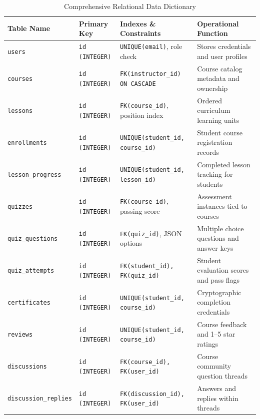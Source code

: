 \documentclass[12pt,a4paper]{report}
\begin{document}
\begin{table}[H]
\centering
\caption{Comprehensive Relational Data Dictionary}
\label{tab:datadict}
\begin{tabularx}{\textwidth}{@{}lllX@{}}
\toprule
\textbf{Table Name} & \textbf{Primary Key} & \textbf{Indexes \& Constraints} & \textbf{Operational Function} \\ \midrule
\texttt{users} & \texttt{id (INTEGER)} & \texttt{UNIQUE(email)}, role check & Stores credentials and user profiles \\
\texttt{courses} & \texttt{id (INTEGER)} & \texttt{FK(instructor\_id) ON CASCADE} & Course catalog metadata and ownership \\
\texttt{lessons} & \texttt{id (INTEGER)} & \texttt{FK(course\_id)}, position index & Ordered curriculum learning units \\
\texttt{enrollments} & \texttt{id (INTEGER)} & \texttt{UNIQUE(student\_id, course\_id)} & Student course registration records \\
\texttt{lesson\_progress} & \texttt{id (INTEGER)} & \texttt{UNIQUE(student\_id, lesson\_id)} & Completed lesson tracking for students \\
\texttt{quizzes} & \texttt{id (INTEGER)} & \texttt{FK(course\_id)}, passing score & Assessment instances tied to courses \\
\texttt{quiz\_questions} & \texttt{id (INTEGER)} & \texttt{FK(quiz\_id)}, JSON options & Multiple choice questions and answer keys \\
\texttt{quiz\_attempts} & \texttt{id (INTEGER)} & \texttt{FK(student\_id), FK(quiz\_id)} & Student evaluation scores and pass flags \\
\texttt{certificates} & \texttt{id (INTEGER)} & \texttt{UNIQUE(student\_id, course\_id)} & Cryptographic completion credentials \\
\texttt{reviews} & \texttt{id (INTEGER)} & \texttt{UNIQUE(student\_id, course\_id)} & Course feedback and 1--5 star ratings \\
\texttt{discussions} & \texttt{id (INTEGER)} & \texttt{FK(course\_id), FK(user\_id)} & Course community question threads \\
\texttt{discussion\_replies} & \texttt{id (INTEGER)} & \texttt{FK(discussion\_id), FK(user\_id)} & Answers and replies within threads \\ \bottomrule
\end{tabularx}
\end{table}
\end{document}
